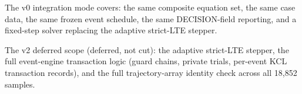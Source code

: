 The v0 integration mode covers: the same composite equation set, the same
case data, the same frozen event schedule, the same DECISION-field
reporting, and a fixed-step solver replacing the adaptive strict-LTE
stepper.

The v2 deferred scope (deferred, not cut): the adaptive strict-LTE
stepper, the full event-engine transaction logic (guard chains, private
trials, per-event KCL transaction records), and the full trajectory-array
identity check across all 18{,}852 samples.
